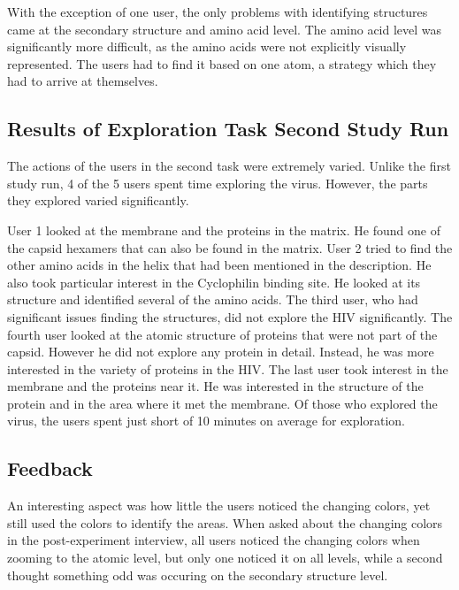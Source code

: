 \documentclass[review,journal]{vgtc}         %
\begin{document}
	With the exception of one user, the only problems with identifying structures came at the secondary structure and amino acid level. 
	The amino acid level was significantly more difficult, as the amino acids were not explicitly visually represented. 
	The users had to find it based on one atom, a strategy which they had to arrive at themselves. 
	
	
	
	\subsection{Results of Exploration Task Second Study Run}
	
	The actions of the users in the second task were extremely varied. 
	Unlike the first study run, 4 of the 5 users spent time exploring the virus. 
	However, the parts they explored varied significantly. 
	
	User 1 looked at the membrane and the proteins in the matrix. 
	He found one of the capsid hexamers that can also be found in the matrix.
	User 2 tried to find the other amino acids in the helix that had been mentioned in the description. 
	He also took particular interest in the Cyclophilin binding site. 
	He looked at its structure and identified several of the amino acids.
	The third user, who had significant issues finding the structures, did not explore the HIV significantly.
	The fourth user looked at the atomic structure of proteins that were not part of the capsid.
	However he did not explore any protein in detail. 
	Instead, he was more interested in the variety of proteins in the HIV.
	The last user took interest in the membrane and the proteins near it.
	He was interested in the structure of the protein and in the area where it met the membrane.
	Of those who explored the virus, the users spent just short of 10 minutes on average for exploration.
	
	
	
	
	\subsection{Feedback}
	An interesting aspect was how little the users noticed the changing colors, yet still used the colors to identify the areas.
	When asked about the changing colors in the post-experiment interview, all users noticed the changing colors when zooming to the atomic level, but only one noticed it on all levels, while a second thought something odd was occuring on the secondary structure level. 
	
\end{document}
